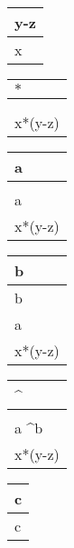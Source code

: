 \documentclass[main.tex]{subfiles}
\begin{document}
\begin{table}[H]
\begin{tabular}{|p{2cm}|}
            \hline
            y-z \\
            \hline
            x \\
            \hline
        \end{tabular}
        \begin{tabular}{|p{2cm}|}
            \hline
            $\boldsymbol{*}$\\
            \hline
            \hline
            \\
            \hline
            \\
            \hline
            x*(y-z)\\
            \hline
        \end{tabular}
    \end{table}
    \begin{table}[H]
        \begin{tabular}{|p{2cm}|}
            \hline
            \textbf{a}\\
            \hline
            \hline
            \\
            \hline
            a \\
            \hline
            x*(y-z)\\
            \hline
        \end{tabular}
        \begin{tabular}{|p{2cm}|}
            \hline
            \textbf{b}\\
            \hline
            \hline
            b \\
            \hline
            a \\
            \hline
            x*(y-z)\\
            \hline
        \end{tabular}
        \begin{tabular}{|p{2cm}|}
            \hline
            \textbf{\textasciicircum}\\
            \hline
            \hline
            \\
            \hline
            a \textasciicircum b\\
            \hline
            x*(y-z)\\
            \hline
        \end{tabular}
        \begin{tabular}{|p{2cm}|}
            \hline
            \textbf{c}\\
            \hline
            \hline
            c\\
            \hline

\end{tabular}
\end{table}
\end{document}
